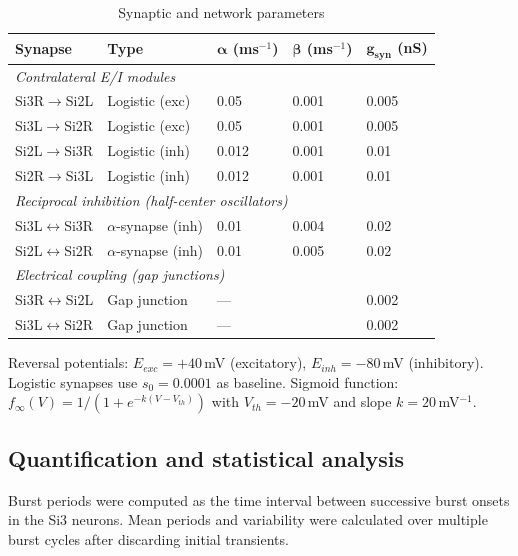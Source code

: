 \begin{table}[htbp]
\centering
\caption{Synaptic and network parameters}
\label{tab:synaptic_params}
\begin{tabular}{|l|l|l|l|l|}
\hline
\textbf{Synapse} & \textbf{Type} & $\boldsymbol{\alpha}$ \textbf{(ms$^{-1}$)} & $\boldsymbol{\beta}$ \textbf{(ms$^{-1}$)} & $\boldsymbol{g_{syn}}$ \textbf{(nS)} \\
\hline
\multicolumn{5}{|l|}{\textit{Contralateral E/I modules}} \\
\hline
Si3R$\to$Si2L & Logistic (exc) & 0.05 & 0.001 & 0.005 \\
Si3L$\to$Si2R & Logistic (exc) & 0.05 & 0.001 & 0.005 \\
Si2L$\to$Si3R & Logistic (inh) & 0.012 & 0.001 & 0.01 \\
Si2R$\to$Si3L & Logistic (inh) & 0.012 & 0.001 & 0.01 \\
\hline
\multicolumn{5}{|l|}{\textit{Reciprocal inhibition (half-center oscillators)}} \\
\hline
Si3L$\leftrightarrow$Si3R & $\alpha$-synapse (inh) & 0.01 & 0.004 & 0.02 \\
Si2L$\leftrightarrow$Si2R & $\alpha$-synapse (inh) & 0.01 & 0.005 & 0.02 \\
\hline
\multicolumn{5}{|l|}{\textit{Electrical coupling (gap junctions)}} \\
\hline
Si3R$\leftrightarrow$Si2L & Gap junction & \multicolumn{2}{l|}{---} & 0.002 \\
Si3L$\leftrightarrow$Si2R & Gap junction & \multicolumn{2}{l|}{---} & 0.002 \\
\hline
\end{tabular}
\vspace{0.5em}

\small
Reversal potentials: $E_{exc} = +40$\,mV (excitatory), $E_{inh} = -80$\,mV (inhibitory).
Logistic synapses use $s_0 = 0.0001$ as baseline.
Sigmoid function: $f_{\infty}(V) = 1/(1 + e^{-k(V - V_{th})})$ with $V_{th} = -20$\,mV and slope $k = 20$\,mV$^{-1}$.
\end{table}


\subsection*{Quantification and statistical analysis}

Burst periods were computed as the time interval between successive burst onsets in the Si3 neurons.
Mean periods and variability were calculated over multiple burst cycles after discarding initial transients.
